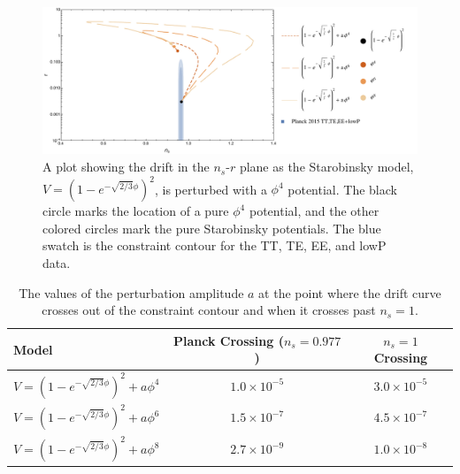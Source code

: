 \documentclass[a4paper,11pt]{article}
\def\nsr{$n_s$-$r$ }
\begin{document}
\begin{minipage}[t][0.4\textheight][t]{\textwidth}
\begin{figure}[H]
	\centering
	\includegraphics[width=\textwidth]{figures/LFP_lines_Rsq_varyaf_final.pdf}
	\caption[Drift in \nsr plane for Starobinsky model with perturbations.]{A plot showing the drift in the \nsr plane as the Starobinsky model, $V=(1-e^{-\sqrt{2/3}\phi})^2$, is perturbed with a $\phi^4$ potential. The black circle marks the location of a pure $\phi^4$ potential, and the other colored circles mark the pure Starobinsky potentials. The blue swatch is the \citet{Planck2015} constraint contour for the TT, TE, EE, and lowP data.}
	\label{fig:LFP_Rsq_drift_af}
\end{figure}
\end{minipage}

\begin{table}[htbp]
   \centering
   \begin{tabular}{@{} l  c  c @{}} %
      \toprule
      Model & Planck Crossing ($n_s=0.977$) &  $n_s=1$ Crossing \\
      \midrule
      $V=(1-e^{-\sqrt{2/3}\phi})^2 + a\phi^4$ & $1.0\times10^{-5}$ & $3.0\times10^{-5}$ \\
       $V=(1-e^{-\sqrt{2/3}\phi})^2 + a\phi^6$ & $1.5\times10^{-7}$ & $4.5\times10^{-7}$ \\
       $V=(1-e^{-\sqrt{2/3}\phi})^2 + a\phi^8$ & $2.7\times10^{-9}$ & $1.0\times10^{-8}$ \\
      \bottomrule
   \end{tabular}
   \caption{The values of the perturbation amplitude $a$ at the point where the drift curve crosses out of the \citet{Planck2015} constraint contour and when it crosses past $n_s=1$.}
   \label{tab:crossings_vary_af}
\end{table}
\end{document}
